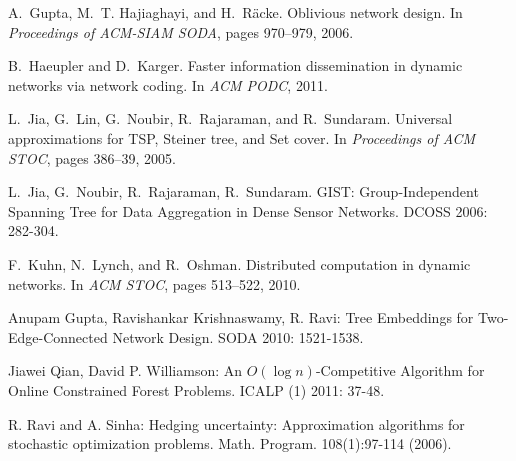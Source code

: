 \documentclass{article}
\begin{document}
{\begin{thebibliography}{99}
A.~Gupta, M.~T. Hajiaghayi, and H.~{R\"{a}cke}.
\newblock Oblivious network design.
\newblock In {\em Proceedings of ACM-SIAM SODA}, pages 970--979, 2006.

B.~Haeupler and D.~Karger.
\newblock Faster information dissemination in dynamic networks via network
  coding.
\newblock In {\em ACM PODC}, 2011.

L.~Jia, G.~Lin, G.~Noubir, R.~Rajaraman, and R.~Sundaram.
\newblock Universal approximations for TSP, Steiner tree, and Set cover.
\newblock In {\em Proceedings of ACM STOC}, pages 386--39, 2005.

L.~Jia, G.~Noubir, R.~Rajaraman, R.~Sundaram.
\newblock
GIST: Group-Independent Spanning Tree for Data Aggregation in Dense Sensor Networks.
\newblock DCOSS 2006: 282-304.

F.~Kuhn, N.~Lynch, and R.~Oshman.
\newblock Distributed computation in dynamic networks.
\newblock In {\em ACM STOC}, pages 513--522, 2010.

 Anupam Gupta, Ravishankar Krishnaswamy, R. Ravi: Tree Embeddings for Two-Edge-Connected Network Design. SODA 2010: 1521-1538.

 Jiawei Qian, David P. Williamson: An $O(\log
  n)$-Competitive Algorithm for Online Constrained Forest
  Problems. ICALP (1) 2011: 37-48.

R. Ravi and A. Sinha:   Hedging uncertainty: Approximation
algorithms for stochastic optimization problems. Math. Program. 108(1):97-114 (2006).
\end{thebibliography}

}
\end{document}
